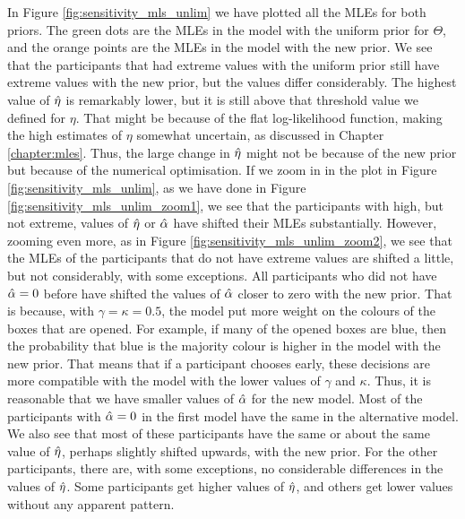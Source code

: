 In Figure \ref{fig:sensitivity_mls_unlim} we have plotted all the MLEs for both priors. The green dots are the MLEs in the model with the uniform prior for $\Theta$, and the orange points are the MLEs in the model with the new prior.
We see that the participants that had extreme values with the uniform prior still have extreme values with the new prior, but the values differ considerably. The highest value of $\hat{\eta}$ is remarkably lower, but it is still above that threshold value we defined for $\eta$. That might be because of the flat log-likelihood function, making the high estimates of $\eta$ somewhat uncertain, as discussed in Chapter \ref{chapter:mles}. Thus, the large change in $\hat{\eta}$ might not be because of the new prior but because of the numerical optimisation. 
If we zoom in in the plot in Figure \ref{fig:sensitivity_mls_unlim}, as we have done in Figure \ref{fig:sensitivity_mls_unlim_zoom1}, we see that the participants with high, but not extreme, values of $\hat{\eta}$ or $\hat{\alpha}$ have shifted their MLEs substantially. 
However, zooming even more, as in Figure \ref{fig:sensitivity_mls_unlim_zoom2}, we see that the MLEs of the participants that do not have extreme values are shifted a little, but not considerably, with some exceptions. All participants who did not have $\hat{\alpha}=0$ before have shifted the values of $\hat{\alpha}$ closer to zero with the new prior. 
That is because, with $\gamma=\kappa=0.5$, the model put more weight on the colours of the boxes that are opened. For example, if many of the opened boxes are blue, then the probability that blue is the majority colour is higher in the model with the new prior. That means that if a participant chooses early, these decisions are more compatible with the model with the lower values of $\gamma$  and $\kappa$. 
Thus, it is reasonable that we have smaller values of $\hat{\alpha}$ for the new model. 
Most of the participants with $\hat{\alpha}=0$ in the first model have the same in the alternative model. We also see that most of these participants have the same or about the same value of $\hat{\eta}$, perhaps slightly shifted upwards, with the new prior. For the other participants, there are, with some exceptions, no considerable differences in the values of $\hat{\eta}$. Some participants get higher values of $\hat{\eta}$, and others get lower values without any apparent pattern. 
